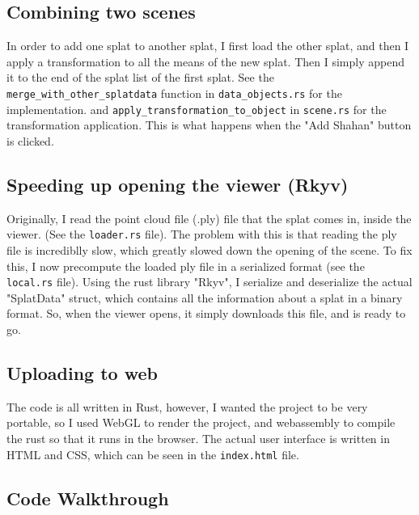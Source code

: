 \documentclass {article}
\begin{document}
\subsection{Combining two scenes}
In order to add one splat to another splat, I first load the other splat, and then I apply a transformation to all the means of the new splat. Then I simply append it to the end of the splat list of the first splat. See the \lstinline[style=inlinecode]{merge_with_other_splatdata} function in \lstinline[style=inlinecode]{data_objects.rs} for the implementation. and \lstinline[style=inlinecode]{apply_transformation_to_object} in \lstinline[style=inlinecode]{scene.rs} for the transformation application. This is what happens when the "Add Shahan" button is clicked.

\subsection{Speeding up opening the viewer (Rkyv)}
Originally, I read the point cloud file (.ply) file that the splat comes in, inside the viewer. (See the \lstinline[style=inlinecode]{loader.rs} file). The problem with this is that reading the ply file is incrediblly slow, which greatly slowed down the opening of the scene. To fix this, I now precompute the loaded ply file in a serialized format (see the \lstinline[style=inlinecode]{local.rs} file). Using the rust library "Rkyv", I serialize and deserialize the actual "SplatData" struct, which contains all the information about a splat in a binary format. So, when the viewer opens, it simply downloads this file, and is ready to go.


\subsection{Uploading to web}
The code is all written in Rust, however, I wanted the project to be very portable, so I used WebGL to render the project, and webassembly to compile the rust so that it runs in the browser. The actual user interface is written in HTML and CSS, which can be seen in the \lstinline[style=inlinecode]{index.html} file.


\subsection{Code Walkthrough}
\end{document}
